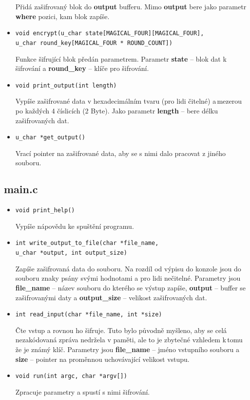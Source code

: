 \documentclass[12pt]{article}
\begin{document}
\begin{itemize}
		Přidá zašifrovaný blok do \textbf{output} bufferu. Mimo
		\textbf{output} bere jako parametr \textbf{where} pozici,
		kam blok zapíše.
	\item \texttt{void encrypt(u\_char state[MAGICAL\_FOUR][MAGICAL\_FOUR],\\
		u\_char round\_key[MAGICAL\_FOUR * ROUND\_COUNT])}

		Funkce šifrující blok předán parametrem. Parametr
		\textbf{state} -- blok dat k\,šifrování a \textbf{round\_key} --
		klíče pro šifrování.
	\item \texttt{void print\_output(int length)}

		Vypíše zašifrované data v hexadecimálním tvaru (pro lidi čitelné)
		a\,mezerou po
		každých 4 číslicích (2 Byte). Jako parametr \textbf{length} --
		bere délku zašifrovaných dat.
	\item \texttt{u\_char *get\_output()}

		Vrací pointer na zašifrované data, aby se s nimi dalo pracovat
		z jiného souboru.
\end{itemize}
\subsection{main.c}
\begin{itemize}
	\item \texttt{void print\_help()}

		Vypíše nápovědu ke spuštění programu.
	\item \texttt{int write\_output\_to\_file(char *file\_name,\\
		u\_char *output, int output\_size)}

		Zapíše zašifrovaná data do souboru. Na rozdíl od výpisu do
		konzole jsou do souboru znaky psány svými hodnotami a pro
		lidi nečitelné. Parametry jsou \textbf{file\_name} -- název 
		souboru do kterého se výstup zapíše, \textbf{output} -- buffer 
		se zašifrovanými daty a \textbf{output\_size} -- velikost
		zašifrovaných dat.
	\item \texttt{int read\_input(char *file\_name, int *size)}

		Čte vstup a rovnou ho šifruje. Tuto bylo původně myšleno, aby
		se celá nezakódovaná zpráva nedržela v paměti, ale to je 
		zbytečné vzhledem k\,tomu že je známý klíč. Parametry jsou
		\textbf{file\_name} -- jméno vstupního souboru a \textbf{size} --
		pointer na proměnnou uchovávající velikost vstupu.
	\item \texttt{void run(int argc, char *argv[])}
		
		Zpracuje parametry a spustí s nimi šifrování.
\end{itemize}
%
%
\end{document}
